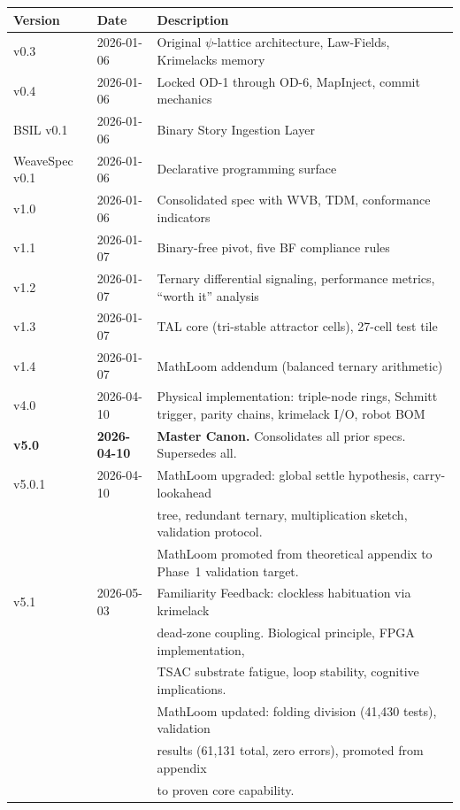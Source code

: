 \documentclass[11pt, a4paper]{report}
\begin{document}
\begin{longtable}{@{}lll@{}}
\toprule
\textbf{Version} & \textbf{Date} & \textbf{Description} \\
\midrule
\endhead
v0.3 & 2026-01-06 & Original $\psi$-lattice architecture, Law-Fields, Krimelacks memory \\
v0.4 & 2026-01-06 & Locked OD-1 through OD-6, MapInject, commit mechanics \\
BSIL v0.1 & 2026-01-06 & Binary Story Ingestion Layer \\
WeaveSpec v0.1 & 2026-01-06 & Declarative programming surface \\
v1.0 & 2026-01-06 & Consolidated spec with WVB, TDM, conformance indicators \\
v1.1 & 2026-01-07 & Binary-free pivot, five BF compliance rules \\
v1.2 & 2026-01-07 & Ternary differential signaling, performance metrics, ``worth it'' analysis \\
v1.3 & 2026-01-07 & TAL core (tri-stable attractor cells), 27-cell test tile \\
v1.4 & 2026-01-07 & MathLoom addendum (balanced ternary arithmetic) \\
v4.0 & 2026-04-10 & Physical implementation: triple-node rings, Schmitt trigger, parity chains,
                     krimelack I/O, robot BOM \\
\textbf{v5.0} & \textbf{2026-04-10} & \textbf{Master Canon.} Consolidates all prior specs. Supersedes all. \\
v5.0.1 & 2026-04-10 & MathLoom upgraded: global settle hypothesis, carry-lookahead \\
       &            & tree, redundant ternary, multiplication sketch, validation protocol. \\
       &            & MathLoom promoted from theoretical appendix to Phase~1 validation target. \\
v5.1 & 2026-05-03 & Familiarity Feedback: clockless habituation via krimelack \\
     &            & dead-zone coupling. Biological principle, FPGA implementation, \\
     &            & TSAC substrate fatigue, loop stability, cognitive implications. \\
     &            & MathLoom updated: folding division (41,430 tests), validation \\
     &            & results (61,131 total, zero errors), promoted from appendix \\
     &            & to proven core capability. \\
\bottomrule
\end{longtable}
\end{document}
